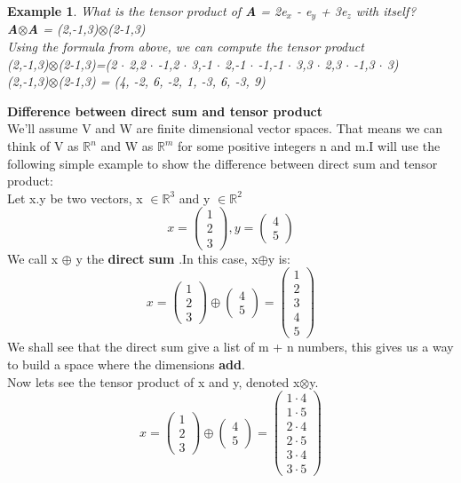 \documentclass[12pt,a4paper]{article}
\newtheorem{exmp}{Example}[section]
\begin{document}
\begin{exmp}
What is the tensor product of \textbf{A} = 2e$_x$ - e$_y$ + 3e$_z$ with itself?\\
\textbf{A}$\otimes$\textbf{A} = (2,-1,3)$\otimes$(2-1,3)\\
Using the formula from above, we can compute the tensor product\\
(2,-1,3)$\otimes$(2-1,3)=(2 $\cdot$ 2,2 $\cdot$ -1,2 $\cdot$ 3,-1 $\cdot$ 2,-1 $\cdot$ -1,-1 $\cdot$ 3,3 $\cdot$ 2,3 $\cdot$ -1,3 $\cdot$ 3)\\
(2,-1,3)$\otimes$(2-1,3) = (4, -2, 6, -2, 1, -3, 6, -3, 9)

\end{exmp}
\textbf{Difference between direct sum and tensor product}\\
We'll assume V and W are finite dimensional vector spaces. That means we can think of V as $\mathbb{R}^n$ and W as $\mathbb{R}^m$ for some positive integers n and m.I will use the following simple example to show the difference between direct sum and tensor product:\\
Let x.y be two vectors, x $\in\mathbb{R}^3$ and y $\in\mathbb{R}^2$
\[x = 
\begin{pmatrix}
1\\2\\3
\end{pmatrix}
,y = 
\begin{pmatrix}
4\\5
\end{pmatrix}
\]
We call x $\oplus$ y the \textbf{direct sum} .In this case, x$\oplus$y is:
\[x = 
\begin{pmatrix}
1\\2\\3
\end{pmatrix}
\oplus
\begin{pmatrix}
4\\5
\end{pmatrix}
=\begin{pmatrix}
1\\2\\3\\4\\5
\end{pmatrix}
\]
We shall see that the direct sum give a list of m + n numbers, this gives us a way to build a space where the dimensions \textbf{add}.\\
Now lets see the tensor product of x and y, denoted x$\otimes$y.
\[x = 
\begin{pmatrix}
1\\2\\3
\end{pmatrix}
\oplus
\begin{pmatrix}
4\\5
\end{pmatrix}
=\begin{pmatrix}
1 \cdot 4 \\ 1 \cdot 5\\2 \cdot 4\\2 \cdot 5\\3 \cdot 4\\3 \cdot 5
\end{pmatrix}
\]
\end{document}
